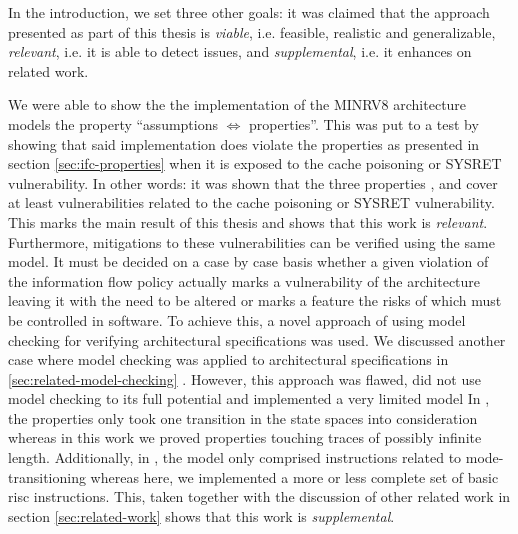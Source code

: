 In the introduction, we set three other goals: it was claimed that the approach presented as part of this thesis is \textit{viable}, i.e. feasible, realistic and generalizable, \textit{relevant}, i.e. it is able to detect issues, and \textit{supplemental}, i.e. it enhances on related work.

We were able to show the the implementation of the MINRV8 architecture models the property \enquote{assumptions $ \Leftrightarrow $ properties}.
This was put to a test by showing that said implementation does violate the properties as presented in section \ref{sec:ifc-properties} when it is exposed to the cache poisoning or SYSRET vulnerability.
In other words: it was shown that the three properties ,  and  cover at least vulnerabilities related to the cache poisoning or SYSRET vulnerability.
This marks the main result of this thesis and shows that this work is \textit{relevant}.
Furthermore, mitigations to these vulnerabilities can be verified using the same model.
It must be decided on a case by case basis whether a given violation of the information flow policy actually marks a vulnerability of the architecture leaving it with the need to be altered or marks a feature the risks of which must be controlled in software.
To achieve this, a novel approach of using model checking for verifying architectural specifications was used.
We discussed another case where model checking was applied to architectural specifications in \ref{sec:related-model-checking} \cite{BradfieldS16}.
However, this approach was flawed, did not use model checking to its full potential and implemented a very limited model
In \cite{BradfieldS16}, the properties only took one transition in the state spaces into consideration whereas in this work we proved properties touching traces of possibly infinite length.
Additionally, in \cite{BradfieldS16}, the model only comprised instructions related to mode-transitioning whereas here, we implemented a more or less complete set of basic \gls{risc} instructions.
This, taken together with the discussion of other related work in section \ref{sec:related-work} shows that this work is \textit{supplemental}.


